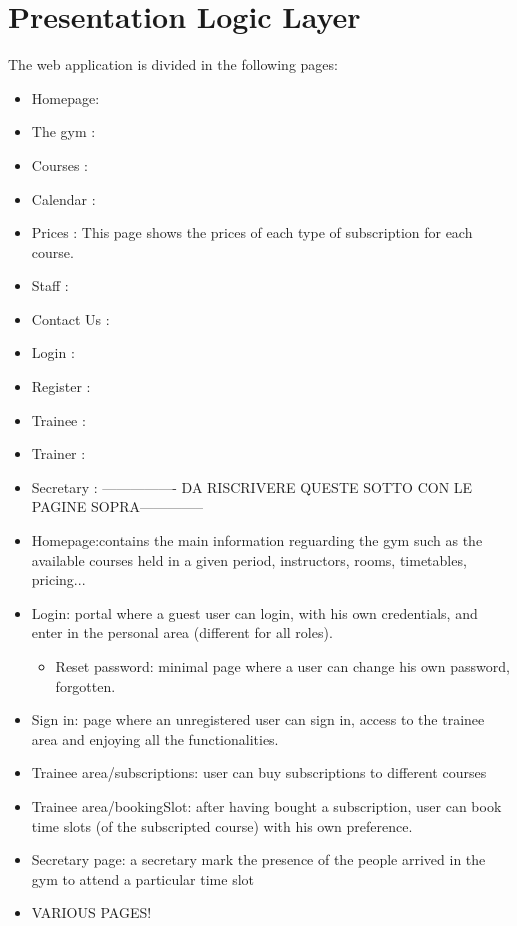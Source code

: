 \section{Presentation Logic Layer}


The web application is divided in the following pages:
\begin{itemize}
	
	
	
	
	\item Homepage: 
	\item The gym :
	\item Courses :
	\item Calendar :
	\item Prices : This page shows the prices of each type of subscription for each course.
	\item Staff :
	\item Contact Us :
	\item Login :
	\item Register :
	\item Trainee :
	\item Trainer :
	\item Secretary :
	---------------- DA RISCRIVERE QUESTE SOTTO CON LE PAGINE SOPRA--------------
	\item Homepage:contains the main information reguarding the gym such as the available courses held in a given period, instructors, rooms, timetables, pricing...
	\item Login: portal where a guest user can login, with his own credentials, and enter in the personal area (different for all roles).
	\begin{itemize}
		\item Reset password: minimal page where a user can change his own password, forgotten.
	\end{itemize}
	\item Sign in: page where an unregistered user can sign in, access to the trainee area and enjoying all the functionalities.
	\item Trainee area/subscriptions: user can buy subscriptions to different courses
	\item Trainee area/bookingSlot: after having bought a subscription, user can book time slots (of the subscripted course) with his own preference.
	\item Secretary page: a secretary mark the presence of the people arrived in the gym to attend a particular time slot
	
	\item VARIOUS PAGES!
\end{itemize}

